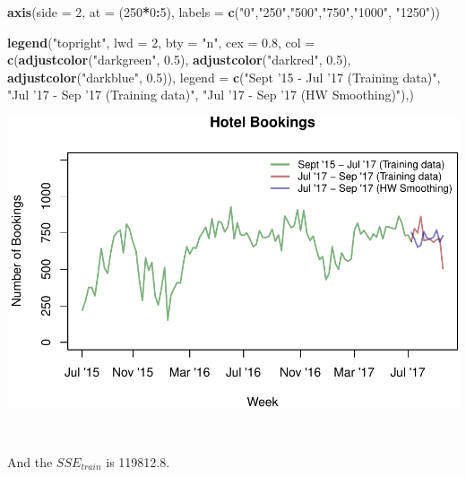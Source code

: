 \documentclass[]{article}
\newenvironment{Shaded}{\begin{snugshade}}{\end{snugshade}}
\newcommand{\DataTypeTok}[1]{\textcolor[rgb]{0.13,0.29,0.53}{#1}}
\newcommand{\DecValTok}[1]{\textcolor[rgb]{0.00,0.00,0.81}{#1}}
\newcommand{\FloatTok}[1]{\textcolor[rgb]{0.00,0.00,0.81}{#1}}
\newcommand{\KeywordTok}[1]{\textcolor[rgb]{0.13,0.29,0.53}{\textbf{#1}}}
\newcommand{\NormalTok}[1]{#1}
\newcommand{\OperatorTok}[1]{\textcolor[rgb]{0.81,0.36,0.00}{\textbf{#1}}}
\newcommand{\StringTok}[1]{\textcolor[rgb]{0.31,0.60,0.02}{#1}}
\begin{document}
\begin{Shaded}
\begin{Highlighting}[]
\KeywordTok{axis}\NormalTok{(}\DataTypeTok{side =} \DecValTok{2}\NormalTok{, }\DataTypeTok{at =}\NormalTok{ (}\DecValTok{250}\OperatorTok{*}\DecValTok{0}\OperatorTok{:}\DecValTok{5}\NormalTok{), }\DataTypeTok{labels =} \KeywordTok{c}\NormalTok{(}\StringTok{"0"}\NormalTok{,}\StringTok{"250"}\NormalTok{,}\StringTok{"500"}\NormalTok{,}\StringTok{"750"}\NormalTok{,}\StringTok{"1000"}\NormalTok{, }\StringTok{"1250"}\NormalTok{))}

\KeywordTok{legend}\NormalTok{(}\StringTok{"topright"}\NormalTok{,}
       \DataTypeTok{lwd =} \DecValTok{2}\NormalTok{,}
       \DataTypeTok{bty =} \StringTok{"n"}\NormalTok{,}
       \DataTypeTok{cex =} \FloatTok{0.8}\NormalTok{,}
       \DataTypeTok{col =} \KeywordTok{c}\NormalTok{(}\KeywordTok{adjustcolor}\NormalTok{(}\StringTok{"darkgreen"}\NormalTok{, }\FloatTok{0.5}\NormalTok{), }\KeywordTok{adjustcolor}\NormalTok{(}\StringTok{"darkred"}\NormalTok{, }\FloatTok{0.5}\NormalTok{), }\KeywordTok{adjustcolor}\NormalTok{(}\StringTok{"darkblue"}\NormalTok{, }\FloatTok{0.5}\NormalTok{)),}
       \DataTypeTok{legend =} \KeywordTok{c}\NormalTok{(}\StringTok{"Sept '15 - Jul '17 (Training data)"}\NormalTok{, }\StringTok{"Jul '17 - Sep '17 (Training data)"}\NormalTok{, }\StringTok{"Jul '17 - Sep '17 (HW Smoothing)"}\NormalTok{),)}
\end{Highlighting}
\end{Shaded}

\begin{center}\includegraphics{bookings_forecast_files/figure-latex/unnamed-chunk-6-1} \end{center}

\(\;\)

And the \(SSE_{train}\) is 119812.8.
\end{document}
